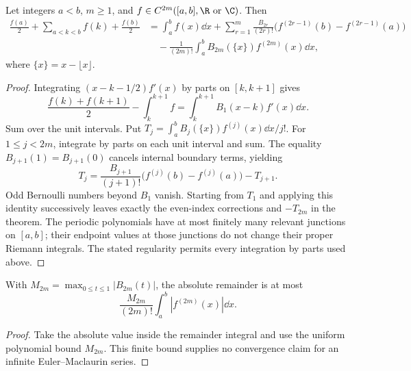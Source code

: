 \begin{theorem}
Let integers $a<b$, $m\geq1$, and $f\in C^{2m}([a,b],\R\text{ or }\C)$.
Then
\begin{align*}
 \frac{f(a)}2+\sum_{a<k<b}f(k)+\frac{f(b)}2
 &=\int_a^b f(x)\dd x+
 \sum_{r=1}^m\frac{B_{2r}}{(2r)!}
 \bigl(f^{(2r-1)}(b)-f^{(2r-1)}(a)\bigr)\\
 &\quad-\frac1{(2m)!}\int_a^b
 B_{2m}(\{x\})f^{(2m)}(x)\dd x,
\end{align*}
where $\{x\}=x-\lfloor x\rfloor$.
\end{theorem}
\begin{proof}
Integrating $(x-k-1/2)f'(x)$ by parts on $[k,k+1]$ gives
\[
 \frac{f(k)+f(k+1)}2-\int_k^{k+1}f
 =\int_k^{k+1}B_1(x-k)f'(x)\dd x.
\]
Sum over the unit intervals. Put
$T_j=\int_a^b B_j(\{x\})f^{(j)}(x)\dd x/j!$.
For $1\leq j<2m$, integrate by parts on each unit interval and sum.
The equality $B_{j+1}(1)=B_{j+1}(0)$ cancels internal boundary terms, yielding
\[
 T_j=\frac{B_{j+1}}{(j+1)!}
 \bigl(f^{(j)}(b)-f^{(j)}(a)\bigr)-T_{j+1}.
\]
Odd Bernoulli numbers beyond $B_1$ vanish. Starting from $T_1$ and applying
this identity successively leaves exactly the even-index corrections and
$-T_{2m}$ in the theorem. The periodic polynomials have at most finitely
many relevant junctions on $[a,b]$; their endpoint values at those junctions
do not change their proper Riemann integrals. The stated regularity permits
every integration by parts used above.
\end{proof}

\begin{corollary}
With $M_{2m}=\max_{0\leq t\leq1}|B_{2m}(t)|$, the absolute remainder is
at most
\[
 \frac{M_{2m}}{(2m)!}\int_a^b|f^{(2m)}(x)|\dd x.
\]
\end{corollary}
\begin{proof}
Take the absolute value inside the remainder integral and use the uniform
polynomial bound $M_{2m}$. This finite bound supplies no convergence
claim for an infinite Euler--Maclaurin series.
\end{proof}

